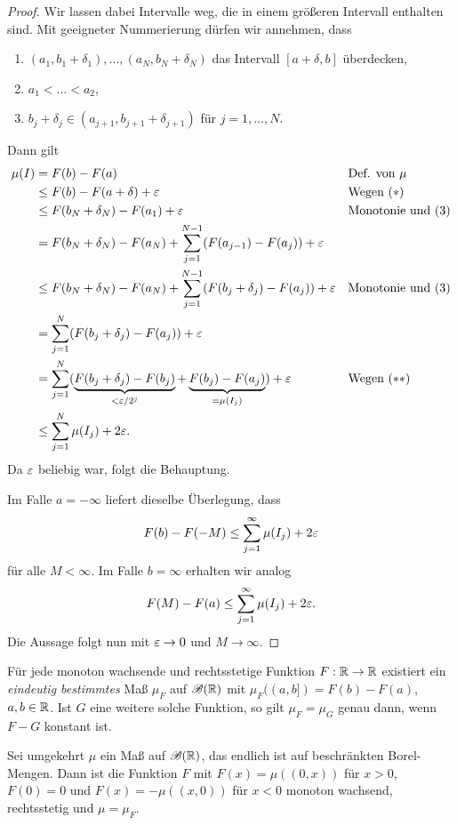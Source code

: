 \begin{proof}
 Wir lassen dabei Intervalle weg, die in einem größeren Intervall enthalten sind. Mit geeigneter Nummerierung dürfen wir annehmen, dass
 \begin{enumerate}[(1)]
  \item $(a_1, b_1 + \delta_1), \ldots, (a_N, b_N + \delta_N)$ das Intervall $[a+\delta,b]$ überdecken,
  \item $a_1 < \ldots < a_2$,
  \item $b_j + \delta_j \in (a_{j+1}, b_{j+1} + \delta_{j+1})$ für $j= 1, \ldots, N$.
 \end{enumerate}
 Dann gilt
 \begin{align*}
  \mu(I) &= F(b) - F(a) & &\text{Def. von $\mu$} \\
         &\le F(b) - F(a+\delta) + \varepsilon & &\text{Wegen } (*) \\
         &\le F(b_N + \delta_N) - F( a_1 ) + \varepsilon & &\text{Monotonie und (3)} \\
         &= F(b_N + \delta_N) - F( a_N ) + \sum_{j=1}^{N-1} (F(a_{j-1}) - F(a_j)) + \varepsilon \\
         &\le F(b_N + \delta_N) - F( a_N ) + \sum_{j=1}^{N-1} (F(b_j + \delta_j) - F(a_j)) + \varepsilon & &\text{Monotonie und (3)} \\
         &=\sum_{j=1}^N (F(b_j + \delta_j) - F(a_j)) + \varepsilon \\
         &=\sum_{j=1}^N (\underbrace{F(b_j + \delta_j) - F(b_j)}_{< \varepsilon/2^j} + \underbrace{F(b_j) - F(a_j)}_{=\mu(I_j)}) + \varepsilon & &\text{Wegen } (**)\\
         &\le \sum_{j=1}^N \mu(I_j) + 2\varepsilon.
 \end{align*}
 Da $\varepsilon$ beliebig war, folgt die Behauptung.

 Im Falle $a= -\infty$ liefert dieselbe Überlegung, dass 
 \[ F(b) - F(-M) \le \sum_{j=1}^\infty \mu(I_j) + 2 \varepsilon \]
 für alle $M < \infty$. Im Falle $b = \infty$ erhalten wir analog
 \[ F(M) - F(a) \le \sum_{j=1}^\infty \mu(I_j) + 2 \varepsilon. \]
 Die Aussage folgt nun mit $\varepsilon \to 0$ und $M \to \infty$.
\end{proof}

\begin{thm}
 Für jede monoton wachsende und rechtsstetige Funktion $F: \mathbb{R} \to \mathbb{R}$ existiert ein \emph{eindeutig bestimmtes} Maß $\mu_F$ auf $\mathscr{B}(\mathbb{R})$ mit $\mu_F( (a,b] ) = F(b) - F(a)$, $a,b \in \mathbb{R}$. Ist $G$ eine weitere solche Funktion, so gilt $\mu_F = \mu_G$ genau dann, wenn $F-G$ konstant ist.
 
 Sei umgekehrt $\mu$ ein Maß auf $\mathscr{B}(\mathbb{R})$, das endlich ist auf beschränkten Borel-Mengen. Dann ist die Funktion $F$ mit $F(x) = \mu((0,x))$ für $x>0$, $F(0) = 0$ und $F(x) = - \mu((x,0))$ für $x<0$ monoton wachsend, rechtsstetig und $\mu = \mu_F$.
\end{thm}

